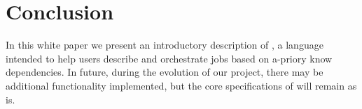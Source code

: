 \section{Conclusion}
\label{sect:conc}
In this white paper we present an introductory description of \lang{}, a language
intended to help users describe and orchestrate jobs based on a-priory know dependencies.
In future, during the evolution of our project, there may be additional functionality
implemented, but the core specifications of \lang{} will remain as is.
